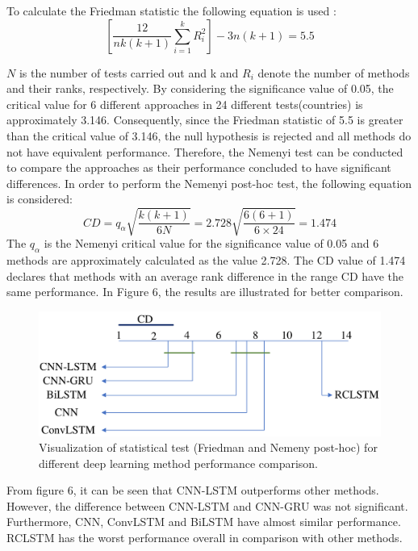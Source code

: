 \documentclass{article}
\begin{document}
To calculate the Friedman statistic the following equation is used \cite{nemenyi1963distribution}:
\begin{equation}
    \left [ \frac{12}{nk(k+1)} \sum_{i=1}^k R_i^2 \right ] - 3n(k+1) = 5.5
\end{equation}

$N$ is the number of tests carried out and k and $R_i$ denote the number of methods and their ranks, respectively. By considering the significance value of 0.05, the critical value for 6 different approaches in 24 different tests(countries) is approximately 3.146. Consequently, since the Friedman statistic of  5.5  is greater than the critical value of 3.146, the null hypothesis is rejected and all methods do not have equivalent performance. Therefore, the Nemenyi test can be conducted to compare the approaches as their performance concluded to have significant differences. In order to perform the Nemenyi post-hoc test, the following equation is considered:\\


\begin{equation}
  CD= q_{\alpha}\sqrt{\frac{k(k+1)}{6N}}=2.728\sqrt{\frac{6(6+1)}{6\times24}}  = 1.474
\end{equation}
The $q_{\alpha}$ is the Nemenyi critical value for the significance value of 0.05 and 6 methods are approximately calculated as the value 2.728. The CD value of 1.474 declares that methods with an average rank difference in the range CD have the same performance. In Figure 6, the results are illustrated for better comparison.
\begin{figure}[t]
	\centering
	\includegraphics [width=4.5 in] {TEST.pdf}
	\caption{Visualization of statistical test (Friedman and Nemeny post-hoc) for different deep learning method performance comparison.}
	\label{figOveall}
\end{figure}
From figure 6, it can be seen that CNN-LSTM outperforms other methods. However, the difference between CNN-LSTM and CNN-GRU was not significant. Furthermore, CNN, ConvLSTM and BiLSTM have almost similar performance. RCLSTM has the worst performance overall in comparison with other methods.
\end{document}
